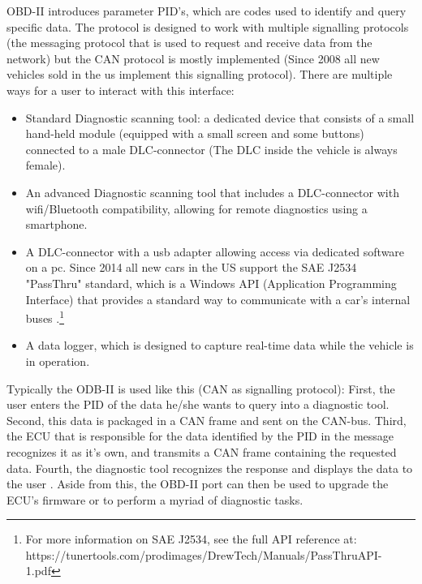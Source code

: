 \documentclass[master=cws,masteroption=vs,english]{kulemt}
\begin{document}
 OBD-II introduces parameter PID's, which are codes used to identify and query specific data. The protocol is designed to work with multiple signalling protocols (the messaging protocol that is used to request and receive data from the network) but the CAN protocol is mostly implemented (Since 2008 all new vehicles sold in the us implement this signalling protocol\cite{OBDconnector}). \newline
\newline
There are multiple ways for a user to interact with this interface:
\begin{itemize}
	\item Standard Diagnostic scanning tool: a dedicated device that consists of a small hand-held module (equipped with a small screen and some buttons) connected to a male DLC-connector (The DLC inside the vehicle is always female).
	
	\item An advanced Diagnostic scanning tool that includes a DLC-connector with wifi/Bluetooth compatibility, allowing for remote diagnostics using a smartphone.
	
	\item A DLC-connector with a usb adapter allowing access via dedicated software on a pc. Since 2014 all new cars in the US support the SAE J2534 "PassThru" standard, which is a Windows API (Application Programming Interface) that provides a standard way to communicate with a car's internal buses \cite{Kosher}.\footnote{For more information on SAE J2534, see the full API reference at: https://tunertools.com/prodimages/DrewTech/Manuals/PassThru\textunderscore API-1.pdf}
	
	\item A data logger, which is designed to capture real-time data while the vehicle is in operation.
\end{itemize}

Typically the ODB-II is used like this (CAN as signalling protocol): First, the user enters the PID of the data he/she wants to query into a diagnostic tool. Second, this data is packaged in a CAN frame and sent on the CAN-bus. Third, the ECU that is responsible for the data identified by the PID in the message recognizes it as it's own, and transmits a CAN frame containing the requested data. Fourth, the diagnostic tool recognizes the response and displays the data to the user \cite{wiki:PID}. Aside from this, the OBD-II port can then be used to upgrade the ECU's firmware or to perform a myriad of diagnostic tasks.
\end{document}
